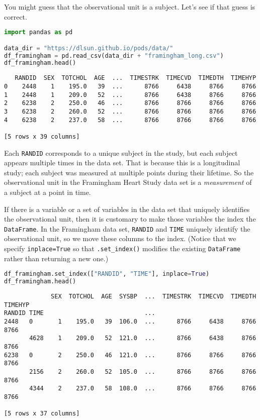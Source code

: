 You might guess that the observational unit is a subject. Let's see if that guess is correct.

\begin{lstlisting}[language=Python]
import pandas as pd

data_dir = "https://dlsun.github.io/pods/data/"
df_framingham = pd.read_csv(data_dir + "framingham_long.csv")
df_framingham.head()
\end{lstlisting}

\small\begin{verbatim}
   RANDID  SEX  TOTCHOL  AGE  ...  TIMESTRK  TIMECVD  TIMEDTH  TIMEHYP
0    2448    1    195.0   39  ...      8766     6438     8766     8766
1    2448    1    209.0   52  ...      8766     6438     8766     8766
2    6238    2    250.0   46  ...      8766     8766     8766     8766
3    6238    2    260.0   52  ...      8766     8766     8766     8766
4    6238    2    237.0   58  ...      8766     8766     8766     8766

[5 rows x 39 columns]
\end{verbatim}



Each \verb|RANDID| corresponds to a unique subject in the study, but each subject appears multiple times in the data set. That is because this is a longitudinal study; each subject was measured at multiple points during their lifetime. So the observational unit in the Framingham Heart Study data set is a \textit{measurement} of a subject at a point in time.

If there is a variable or a set of variables in the data set that uniquely identifies the observational unit, then it is customary to make those variables the index the \verb|DataFrame|. In the Framingham data set, \verb|RANDID| and \verb|TIME| uniquely identify the observational unit, so we move these columns to the index. (Notice that we specify \verb|inplace=True| so that \verb|.set_index()| modifies the existing \verb|DataFrame| rather than returning a new one.)

\begin{lstlisting}[language=Python]
df_framingham.set_index(["RANDID", "TIME"], inplace=True)
df_framingham.head()
\end{lstlisting}

\small\begin{verbatim}
             SEX  TOTCHOL  AGE  SYSBP  ...  TIMESTRK  TIMECVD  TIMEDTH  TIMEHYP
RANDID TIME                            ...                                     
2448   0       1    195.0   39  106.0  ...      8766     6438     8766     8766
       4628    1    209.0   52  121.0  ...      8766     6438     8766     8766
6238   0       2    250.0   46  121.0  ...      8766     8766     8766     8766
       2156    2    260.0   52  105.0  ...      8766     8766     8766     8766
       4344    2    237.0   58  108.0  ...      8766     8766     8766     8766

[5 rows x 37 columns]
\end{verbatim}



